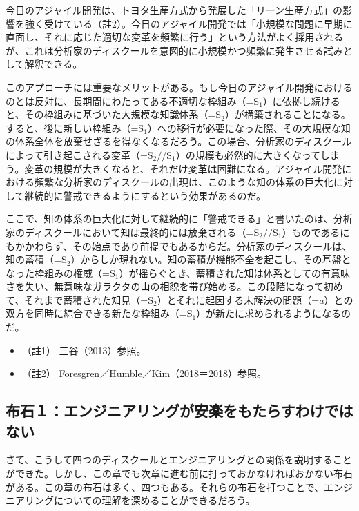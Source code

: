 今日のアジャイル開発は、トヨタ生産方式から発展した「リーン生産方式」の影響を強く受けている（註2）。今日のアジャイル開発では「小規模な問題に早期に直面し、それに応じた適切な変革を頻繁に行う」という方法がよく採用されるが、これは分析家のディスクールを意図的に小規模かつ頻繁に発生させる試みとして解釈できる。

このアプローチには重要なメリットがある。もし今日のアジャイル開発におけるのとは反対に、長期間にわたってある不適切な枠組み（=\(\textrm{S}_1\)）に依拠し続けると、その枠組みに基づいた大規模な知識体系（=\(\textrm{S}_2\)）が構築されることになる。すると、後に新しい枠組み（=\(\textrm{S}_1\)）への移行が必要になった際、その大規模な知の体系全体を放棄せざるを得なくなるだろう。この場合、分析家のディスクールによって引き起こされる変革（=\(\textrm{S}_2//\textrm{S}_1\)）の規模も必然的に大きくなってしまう。変革の規模が大きくなると、それだけ変革は困難になる。アジャイル開発における頻繁な分析家のディスクールの出現は、このような知の体系の巨大化に対して継続的に警戒できるようにするという効果があるのだ。

ここで、知の体系の巨大化に対して継続的に「警戒できる」と書いたのは、分析家のディスクールにおいて知は最終的には放棄される（=\(\textrm{S}_2//\textrm{S}_1\)）ものであるにもかかわらず、その始点であり前提でもあるからだ。分析家のディスクールは、知の蓄積（=\(\textrm{S}_2\)）からしか現れない。知の蓄積が機能不全を起こし、その基盤となった枠組みの権威（=\(\textrm{S}_1\)）が揺らぐとき、蓄積された知は体系としての有意味さを失い、無意味なガラクタの山の相貌を帯び始める。この段階になって初めて、それまで蓄積された知見（=\(\textrm{S}_2\)）とそれに起因する未解決の問題（=\(a\)）との双方を同時に綜合できる新たな枠組み（=\(\textrm{S}_1\)）が新たに求められるようになるのだ。

\begin{itemize}
\tightlist
\item
  （註1） 三谷（2013）\cite{Mitani}参照。
\item
  （註2） Foresgren／Humble／Kim（2018＝2018）\cite{ForesgrenEtAl}参照。
\end{itemize}

\subsection{布石１：エンジニアリングが安楽をもたらすわけではない}\label{ux5e03ux77f3uxff11ux30a8ux30f3ux30b8ux30cbux30a2ux30eaux30f3ux30b0ux304cux5b89ux697dux3092ux3082ux305fux3089ux3059ux308fux3051ux3067ux306fux306aux3044}

さて、こうして四つのディスクールとエンジニアリングとの関係を説明することができた。しかし、この章でも次章に進む前に打っておかなければおかない布石がある。この章の布石は多く、四つもある。それらの布石を打つことで、エンジニアリングについての理解を深めることができるだろう。

